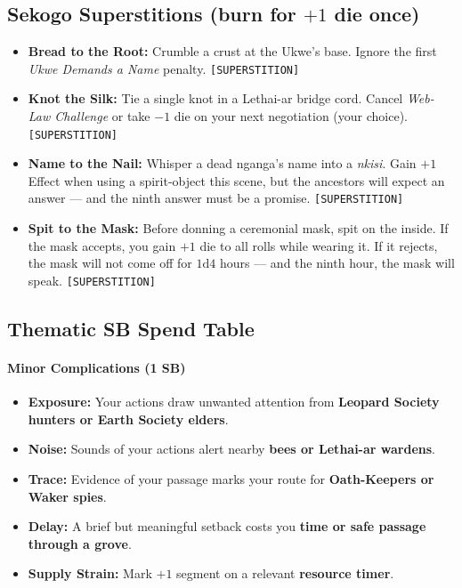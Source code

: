 \subsection*{Sekogo Superstitions (burn for $+1$ die once)}
\begin{itemize}
  \item \textbf{Bread to the Root:} Crumble a crust at the Ukwe's base. Ignore the first \emph{Ukwe Demands a Name} penalty. \texttt{[SUPERSTITION]}
  \item \textbf{Knot the Silk:} Tie a single knot in a Lethai-ar bridge cord. Cancel \emph{Web-Law Challenge} or take $-1$ die on your next negotiation (your choice). \texttt{[SUPERSTITION]}
  \item \textbf{Name to the Nail:} Whisper a dead nganga's name into a \textit{nkisi}. Gain $+1$ Effect when using a spirit-object this scene, but the ancestors will expect an answer --- and the ninth answer must be a promise. \texttt{[SUPERSTITION]}
  \item \textbf{Spit to the Mask:} Before donning a ceremonial mask, spit on the inside. If the mask accepts, you gain $+1$ die to all rolls while wearing it. If it rejects, the mask will not come off for $1\text{d}4$ hours --- and the ninth hour, the mask will speak. \texttt{[SUPERSTITION]}
\end{itemize}

\subsection*{Thematic SB Spend Table}
\label{sec:sekogo-sb}

\paragraph{Minor Complications (1 SB)}
\begin{itemize}
\item \textbf{Exposure:} Your actions draw unwanted attention from \textbf{Leopard Society hunters or Earth Society elders}.
\item \textbf{Noise:} Sounds of your actions alert nearby \textbf{bees or Lethai-ar wardens}.
\item \textbf{Trace:} Evidence of your passage marks your route for \textbf{Oath-Keepers or Waker spies}.
\item \textbf{Delay:} A brief but meaningful setback costs you \textbf{time or safe passage through a grove}.
\item \textbf{Supply Strain:} Mark $+1$ segment on a relevant \textbf{resource timer}.
\end{itemize}

